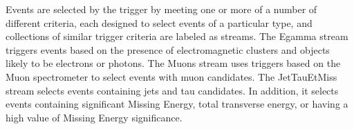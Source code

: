 Events are selected by the trigger by meeting one or more of a number of different
criteria, each designed to select events of a particular type, and collections
of similar trigger criteria are labeled as streams.
The Egamma stream triggers events based on the presence of electromagnetic clusters
and objects likely to be electrons or photons.
The Muons stream uses triggers based on the Muon spectrometer to select events with
muon candidates.
The JetTauEtMiss stream selects events containing jets and tau candidates.
In addition, it selects events containing significant Missing Energy, total
transverse energy, or having a high value of Missing Energy significance.





